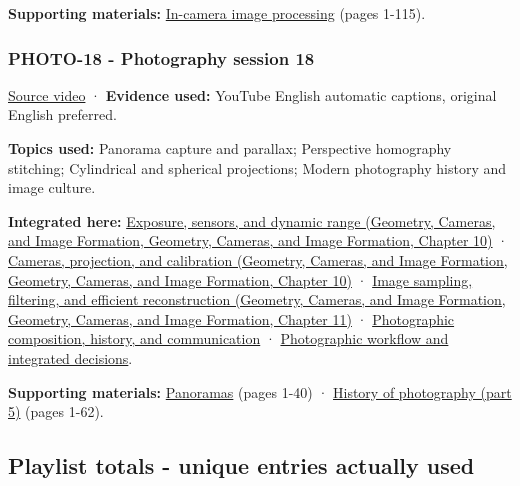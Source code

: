 \textbf{Supporting materials:} \href{https://drive.google.com/open?id=0B6w2XfPHEcZYeTFKZWhndVBOYTA}{In-camera image processing} (pages 1-115).

\subsubsection{PHOTO-18 - Photography session 18}\label{04-visual-computing-ii-ch036-photo-18---photography-session-18}

\href{https://www.youtube.com/watch?v=fE0GQ9Tvn4U}{Source video} · \textbf{Evidence used:} YouTube English automatic captions, original English preferred.

\textbf{Topics used:} Panorama capture and parallax; Perspective homography stitching; Cylindrical and spherical projections; Modern photography history and image culture.

\textbf{Integrated here:} \href{../03-Geometry-Cameras-and-Image-Formation/main.pdf\#nameddest=03-visual-computing-i-ch003-exposure-sensors-and-dynamic-range}{Exposure, sensors, and dynamic range (Geometry, Cameras, and Image Formation, Geometry, Cameras, and Image Formation, Chapter 10)} · \href{../03-Geometry-Cameras-and-Image-Formation/main.pdf\#nameddest=03-visual-computing-i-ch003-cameras-projection-and-calibration}{Cameras, projection, and calibration (Geometry, Cameras, and Image Formation, Geometry, Cameras, and Image Formation, Chapter 10)} · \href{../03-Geometry-Cameras-and-Image-Formation/main.pdf\#nameddest=03-visual-computing-i-ch004-image-sampling-filtering-and-efficient-reconstruction}{Image sampling, filtering, and efficient reconstruction (Geometry, Cameras, and Image Formation, Geometry, Cameras, and Image Formation, Chapter 11)} · \hyperref[04-visual-computing-ii-ch034-photographic-composition-history-and-communication]{Photographic composition, history, and communication} · \hyperref[04-visual-computing-ii-ch034-photographic-workflow-and-integrated-decisions]{Photographic workflow and integrated decisions}.

\textbf{Supporting materials:} \href{https://drive.google.com/open?id=0B6w2XfPHEcZYYVNCbmdFRUI1Zjg}{Panoramas} (pages 1-40) · \href{https://drive.google.com/open?id=0B6w2XfPHEcZYMU1OLTI2QUZQa1E}{History of photography (part 5)} (pages 1-62).

\subsection{Playlist totals - unique entries actually used}\label{04-visual-computing-ii-ch036-playlist-totals---unique-entries-actually-used}

